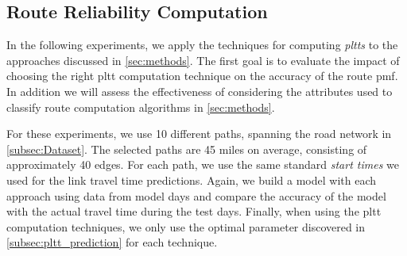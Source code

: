 \subsection{Route Reliability Computation}
In the following experiments, we apply the techniques for computing
\textit{pltts} to the approaches discussed in \cref{sec:methods}. The first goal
is to evaluate the impact of choosing the right pltt computation technique on
the accuracy of the route pmf. In addition we will assess the effectiveness of
considering the attributes used to classify route computation algorithms in
\cref{sec:methods}.

For these experiments, we use 10 different paths, spanning the road network in
\ref{subsec:Dataset}. The selected paths are 45 miles on average, consisting of
approximately 40 edges. For each path, we use the same standard \textit{start
times} we used for the link travel time predictions. Again, we build a model
with each approach using data from model days and compare the accuracy of the
model with the actual travel time during the test days. Finally, when using the
pltt computation techniques, we only use the optimal parameter discovered in
\cref{subsec:pltt_prediction} for each technique.


